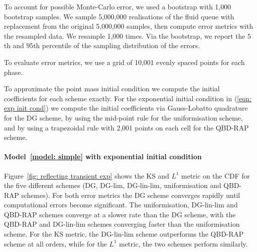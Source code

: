 To account for possible Monte-Carlo error, we used a bootstrap with 1,000 bootstrap samples. We sample 5,000,000 realisations of the fluid queue with replacement from the original 5,000,000 samples, then compute error metrics with the resampled data. We resample 1,000 times. Via the bootstrap, we report the \(5\)th and \(95\)th percentile of the sampling distribution of the errors. 

To evaluate error metrics, we use a grid of 10,001 evenly spaced points for each phase.

To approximate the point mass initial condition we compute the initial coefficients for each scheme exactly. For the exponential initial condition in (\ref{eqn: exp init cond}) we compute the initial coefficients via Gauss-Lobatto quadrature for the DG scheme, by using the mid-point rule for the uniformisation scheme, and by using a trapezoidal rule with 2,001 points on each cell for the QBD-RAP scheme. 

\paragraph{Model~\ref{model: simple} with exponential initial condition}
Figure~\ref{fig: reflecting transient exp} shows the KS and \(L^1\) metric on the CDF  for the five different schemes (DG, DG-lim, DG-lin-lim, uniformisation and QBD-RAP schemes). For both error metrics the DG scheme converges rapidly until computational errors become significant. The uniformisation, DG-lin-lim and QBD-RAP schemes converge at a slower rate than the DG scheme, with the QBD-RAP and DG-lin-lim schemes converging faster than the uniformisation scheme. For the KS metric, the DG-lin-lim scheme outperforms the QBD-RAP scheme at all orders, while for the \(L^1\) metric, the two schemes perform similarly. 

